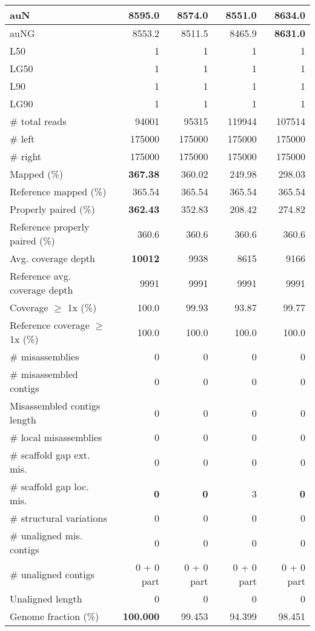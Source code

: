 \documentclass[12pt,a4paper]{article}
\begin{document}
\begin{table}[ht]
\begin{center}
\begin{tabular}{|l*{4}{|r}|}
auN & 8595.0 & 8574.0 & 8551.0 & {\bf 8634.0} \\ \hline
auNG & 8553.2 & 8511.5 & 8465.9 & {\bf 8631.0} \\ \hline
L50 & 1 & 1 & 1 & 1 \\ \hline
LG50 & 1 & 1 & 1 & 1 \\ \hline
L90 & 1 & 1 & 1 & 1 \\ \hline
LG90 & 1 & 1 & 1 & 1 \\ \hline
\# total reads & 94001 & 95315 & 119944 & 107514 \\ \hline
\# left & 175000 & 175000 & 175000 & 175000 \\ \hline
\# right & 175000 & 175000 & 175000 & 175000 \\ \hline
Mapped (\%) & {\bf 367.38} & 360.02 & 249.98 & 298.03 \\ \hline
Reference mapped (\%) & 365.54 & 365.54 & 365.54 & 365.54 \\ \hline
Properly paired (\%) & {\bf 362.43} & 352.83 & 208.42 & 274.82 \\ \hline
Reference properly paired (\%) & 360.6 & 360.6 & 360.6 & 360.6 \\ \hline
Avg. coverage depth & {\bf 10012} & 9938 & 8615 & 9166 \\ \hline
Reference avg. coverage depth & 9991 & 9991 & 9991 & 9991 \\ \hline
Coverage $\geq$ 1x (\%) & 100.0 & 99.93 & 93.87 & 99.77 \\ \hline
Reference coverage $\geq$ 1x (\%) & 100.0 & 100.0 & 100.0 & 100.0 \\ \hline
\# misassemblies & 0 & 0 & 0 & 0 \\ \hline
\# misassembled contigs & 0 & 0 & 0 & 0 \\ \hline
Misassembled contigs length & 0 & 0 & 0 & 0 \\ \hline
\# local misassemblies & 0 & 0 & 0 & 0 \\ \hline
\# scaffold gap ext. mis. & 0 & 0 & 0 & 0 \\ \hline
\# scaffold gap loc. mis. & {\bf 0} & {\bf 0} & 3 & {\bf 0} \\ \hline
\# structural variations & 0 & 0 & 0 & 0 \\ \hline
\# unaligned mis. contigs & 0 & 0 & 0 & 0 \\ \hline
\# unaligned contigs & 0 + 0 part & 0 + 0 part & 0 + 0 part & 0 + 0 part \\ \hline
Unaligned length & 0 & 0 & 0 & 0 \\ \hline
Genome fraction (\%) & {\bf 100.000} & 99.453 & 94.399 & 98.451 \\ \hline

\end{tabular}
\end{center}
\end{table}
\end{document}
